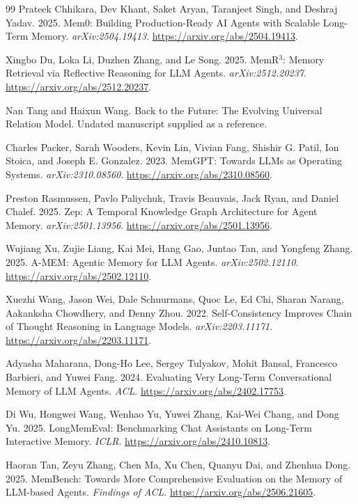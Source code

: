 \documentclass[10pt,twocolumn]{article}
\begin{document}
\begin{thebibliography}{99}
Prateek Chhikara, Dev Khant, Saket Aryan, Taranjeet Singh, and Deshraj
Yadav. 2025. Mem0: Building Production-Ready AI Agents with Scalable
Long-Term Memory. \emph{arXiv:2504.19413}.
\url{https://arxiv.org/abs/2504.19413}.

Xingbo Du, Loka Li, Duzhen Zhang, and Le Song. 2025.
MemR$^3$: Memory Retrieval via Reflective Reasoning for LLM Agents.
\emph{arXiv:2512.20237}.
\url{https://arxiv.org/abs/2512.20237}.

Nan Tang and Haixun Wang.
Back to the Future: The Evolving Universal Relation Model.
Undated manuscript supplied as a reference.

Charles Packer, Sarah Wooders, Kevin Lin, Vivian Fang, Shishir G. Patil,
Ion Stoica, and Joseph E. Gonzalez. 2023.
MemGPT: Towards LLMs as Operating Systems. \emph{arXiv:2310.08560}.
\url{https://arxiv.org/abs/2310.08560}.

Preston Rasmussen, Pavlo Paliychuk, Travis Beauvais, Jack Ryan, and
Daniel Chalef. 2025.
Zep: A Temporal Knowledge Graph Architecture for Agent Memory.
\emph{arXiv:2501.13956}. \url{https://arxiv.org/abs/2501.13956}.

Wujiang Xu, Zujie Liang, Kai Mei, Hang Gao, Juntao Tan, and Yongfeng
Zhang. 2025. A-MEM: Agentic Memory for LLM Agents.
\emph{arXiv:2502.12110}. \url{https://arxiv.org/abs/2502.12110}.

Xuezhi Wang, Jason Wei, Dale Schuurmans, Quoc Le, Ed Chi, Sharan
Narang, Aakanksha Chowdhery, and Denny Zhou. 2022.
Self-Consistency Improves Chain of Thought Reasoning in Language Models.
\emph{arXiv:2203.11171}. \url{https://arxiv.org/abs/2203.11171}.

Adyasha Maharana, Dong-Ho Lee, Sergey Tulyakov, Mohit Bansal, Francesco
Barbieri, and Yuwei Fang. 2024. Evaluating Very Long-Term Conversational
Memory of LLM Agents. \emph{ACL}.
\url{https://arxiv.org/abs/2402.17753}.

Di Wu, Hongwei Wang, Wenhao Yu, Yuwei Zhang, Kai-Wei Chang, and Dong Yu.
2025. LongMemEval: Benchmarking Chat Assistants on Long-Term Interactive
Memory. \emph{ICLR}. \url{https://arxiv.org/abs/2410.10813}.

Haoran Tan, Zeyu Zhang, Chen Ma, Xu Chen, Quanyu Dai, and Zhenhua Dong.
2025. MemBench: Towards More Comprehensive Evaluation on the Memory of
LLM-based Agents. \emph{Findings of ACL}.
\url{https://arxiv.org/abs/2506.21605}.
\end{thebibliography}
\end{document}
